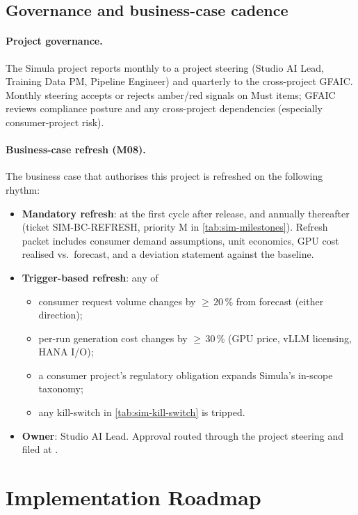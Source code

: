 \documentclass[12pt,a4paper,twoside]{report}
\begin{document}
\section{Governance and business-case cadence}\label{sec:sim-governance}

\subsubsection{Project governance.}
The Simula project reports monthly to a project steering (Studio AI
Lead, Training Data PM, Pipeline Engineer) and quarterly to the
cross-project GFAIC. Monthly steering accepts or rejects amber/red
signals on Must items; GFAIC reviews compliance posture and any
cross-project dependencies (especially consumer-project risk).

\subsubsection{Business-case refresh (M08).}
The business case that authorises this project is refreshed on the
following rhythm:

\begin{itemize}
\item \textbf{Mandatory refresh}: at the first cycle after release,
and annually thereafter (ticket SIM-BC-REFRESH, priority M in
\cref{tab:sim-milestones}). Refresh packet includes consumer
demand assumptions, unit economics,
GPU cost realised vs.\ forecast, and a deviation statement
against the baseline.
\item \textbf{Trigger-based refresh}: any of
\begin{itemize}
\item consumer request volume changes by $\ge\,20$\,\% from
forecast (either direction);
\item per-run generation cost changes by $\ge\,30$\,\% (GPU
price, vLLM licensing, HANA I/O);
\item a consumer project's regulatory obligation expands
Simula's in-scope taxonomy;
\item any kill-switch in \cref{tab:sim-kill-switch} is
tripped.
\end{itemize}
\item \textbf{Owner}: Studio AI Lead. Approval routed through the
project steering and filed at
.
\end{itemize}
\chapter{Implementation Roadmap}
\label{chap:implementation-roadmap}
\end{document}

